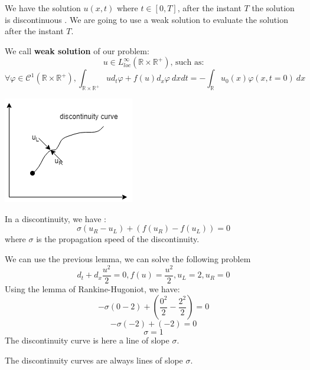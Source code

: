         We have the solution $u\left(x,t\right)$ where $t\in [ 0, T]$, after the instant $T$ the solution is discontinuous . We are going to use a weak solution to evaluate the solution after the instant $T$.
        \begin{definition}
            We call \textbf{ weak solution} of our problem:
            \begin{equation*}
                 u \in L^\infty_{loc} \left(\mathds{R}\times\mathds{R}^+\right)\text{, such as:}
            \end{equation*}
            \begin{equation*}
                \forall \varphi\in \mathscr{C}^1\left(\mathds{R}\times\mathds{R}^+\right), \int_{\mathds{R}\times\mathds{R}^+} u d_t \varphi + f\left(u\right) d_x\varphi~dx dt = -\int_\mathds{R} u_0\left(x\right) \varphi\left(x, t=0\right)~dx
            \end{equation*}
        \end{definition}   
        \includegraphics{curve.png}
        
        \begin{lemma}
            In a discontinuity, we have :
            \begin{equation*}
                \sigma\left(u_R-u_L\right) + \left(f\left(u_R\right) - f\left(u_L\right)\right)=0
            \end{equation*}
            where $\sigma$ is the propagation speed of the discontinuity.
        \end{lemma}
        
        We can use the previous lemma, we can solve the following problem
        \begin{equation*}
            d_t + d_x\frac{u^2}{2}=0, f\left(u\right)=\frac{u^2}{2}, u_L=2, u_R=0
        \end{equation*}
        Using the lemma of Rankine-Hugoniot, we have:
        \begin{equation*}
            -\sigma\left(0 - 2\right) + \left(\frac{0^2}{2} - \frac{2^2}{2}\right) = 0
        \end{equation*}
        \begin{equation*}
            -\sigma\left(-2\right) + \left(-2\right)=0
        \end{equation*}
        \begin{equation*}
            \sigma=1
        \end{equation*}
        The discontinuity curve is here a line of slope $\sigma$. 
        \begin{remark}
            The discontinuity curves are always lines of slope $\sigma$.
        \end{remark}
    
